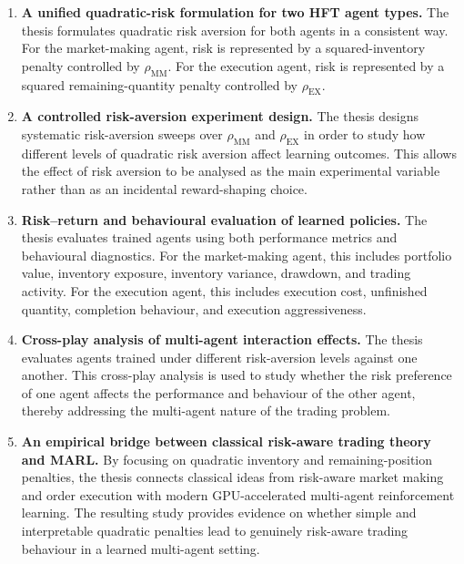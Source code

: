 \documentclass[oneside]{uva-inf-bachelor-thesis}
\begin{document}
\begin{enumerate}
    \item \textbf{A unified quadratic-risk formulation for two HFT agent types.}
    The thesis formulates quadratic risk aversion for both agents in a consistent way. For the market-making agent, risk is represented by a squared-inventory penalty controlled by $\rho_{\mathrm{MM}}$. For the execution agent, risk is represented by a squared remaining-quantity penalty controlled by $\rho_{\mathrm{EX}}$.

    \item \textbf{A controlled risk-aversion experiment design.}
    The thesis designs systematic risk-aversion sweeps over $\rho_{\mathrm{MM}}$ and $\rho_{\mathrm{EX}}$ in order to study how different levels of quadratic risk aversion affect learning outcomes. This allows the effect of risk aversion to be analysed as the main experimental variable rather than as an incidental reward-shaping choice.

    \item \textbf{Risk--return and behavioural evaluation of learned policies.}
    The thesis evaluates trained agents using both performance metrics and behavioural diagnostics. For the market-making agent, this includes portfolio value, inventory exposure, inventory variance, drawdown, and trading activity. For the execution agent, this includes execution cost, unfinished quantity, completion behaviour, and execution aggressiveness.

    \item \textbf{Cross-play analysis of multi-agent interaction effects.}
    The thesis evaluates agents trained under different risk-aversion levels against one another. This cross-play analysis is used to study whether the risk preference of one agent affects the performance and behaviour of the other agent, thereby addressing the multi-agent nature of the trading problem.

    \item \textbf{An empirical bridge between classical risk-aware trading theory and MARL.}
    By focusing on quadratic inventory and remaining-position penalties, the thesis connects classical ideas from risk-aware market making and order execution with modern GPU-accelerated multi-agent reinforcement learning. The resulting study provides evidence on whether simple and interpretable quadratic penalties lead to genuinely risk-aware trading behaviour in a learned multi-agent setting.
\end{enumerate}
\end{document}

